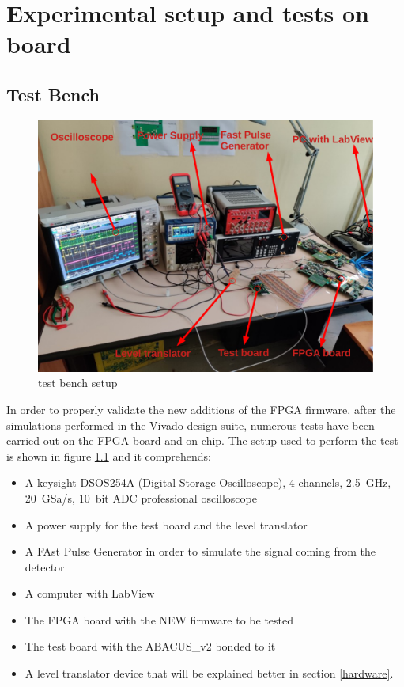 \chapter{Experimental setup and tests on board}
\section{Test Bench}\label{testbench}
\begin{figure}[H]
	\centering
	\includegraphics[width=0.7\linewidth]{IMG/ch5/TESTBENCH}
	\caption{test bench setup}
	\label{fig:testbench}
\end{figure}
In order to properly validate the new additions of the FPGA firmware, after the simulations performed in the Vivado design suite, numerous tests have been carried out on the FPGA board and on chip.
The setup used to perform the test is shown in figure \ref{fig:testbench} and it comprehends:
\begin{itemize}
	\item A keysight DSOS254A (Digital Storage Oscilloscope), 4-channels, 2.5~GHz, 20~GSa/s, 10~bit ADC professional oscilloscope
	\item A power supply for the test board and the level translator
	\item A FAst Pulse Generator in order to simulate the signal coming from the detector
	\item A computer with LabView
	\item The FPGA board with the NEW firmware to be tested
	\item The test board with the ABACUS\_v2 bonded to it
	\item A level translator device that will be explained better in section \ref{hardware}.
\end{itemize}


